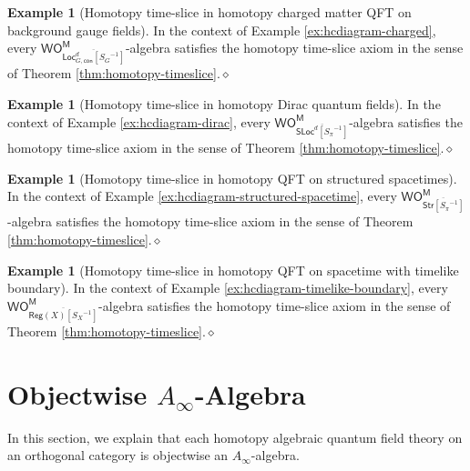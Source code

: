 \documentclass{amsbook}
\numberwithin{section}{chapter}
\numberwithin{subsection}{section}
\numberwithin{equation}{section}
\theoremstyle{plain}
\theoremstyle{definition}
\newtheorem{example}[equation]{Example}
\newcommand{\M}{\mathsf{M}}
\renewcommand{\O}{\mathsf{O}}
\newcommand{\Otom}{\O^{\M}}
\newcommand{\W}{\mathsf{W}}
\newcommand{\dqed}{\hfill$\diamond$}
\newcommand{\inv}[1]{{#1}^{-1}}
\newcommand{\Bgconloc}{\Locd_{G,\mathsf{con}}}
\newcommand{\Bgconlocsginv}{\Bgconloc[\inv{S_G}]}
\newcommand{\Bgconlocsginvbar}{\overline{\Bgconlocsginv}}
\newcommand{\Loc}{\mathsf{Loc}}
\newcommand{\Locd}{\Loc^d}
\newcommand{\Reg}{\mathsf{Reg}}
\newcommand{\Regx}{\Reg(X)}
\newcommand{\Regxsinv}{\Regx[\inv{S_X}]}
\newcommand{\Regxsinvbar}{\overline{\Regxsinv}}
\newcommand{\Sloc}{\mathsf{SLoc}}
\newcommand{\Slocd}{\Sloc^d}
\newcommand{\Slocdsinv}{\Slocd[\inv{S_{\pi}}]}
\newcommand{\Slocdsinvbar}{\overline{\Slocdsinv}}
\newcommand{\Str}{\mathsf{Str}}
\newcommand{\Strsinv}{\Str[\inv{S_{\pi}}]}
\newcommand{\Strsinvbar}{\overline{\Strsinv}}
\newcommand{\wom}{\W\Otom}
\begin{document}
\begin{example}[Homotopy time-slice in homotopy charged matter QFT on background gauge fields]\label{ex:hts-charged}
In the context of Example \ref{ex:hcdiagram-charged}, every  $\wom_{\Bgconlocsginvbar}$-algebra satisfies the homotopy time-slice axiom in the sense of Theorem \ref{thm:homotopy-timeslice}.\dqed
\end{example}

\begin{example}[Homotopy time-slice in homotopy Dirac quantum fields]\label{ex:hts-dirac}
In the context of Example \ref{ex:hcdiagram-dirac}, every  $\wom_{\Slocdsinvbar}$-algebra satisfies the homotopy time-slice axiom in the sense of Theorem \ref{thm:homotopy-timeslice}.\dqed
\end{example}

\begin{example}[Homotopy time-slice in homotopy QFT on structured spacetimes]\label{ex:hts-structured-spacetime}
In the context of Example \ref{ex:hcdiagram-structured-spacetime}, every  $\wom_{\Strsinvbar}$-algebra satisfies the homotopy time-slice axiom in the sense of Theorem \ref{thm:homotopy-timeslice}.\dqed
\end{example}

\begin{example}[Homotopy time-slice in homotopy QFT on spacetime with timelike boundary]\label{ex:hts-boundary}
In the context of Example \ref{ex:hcdiagram-timelike-boundary}, every  $\wom_{\Regxsinvbar}$-algebra satisfies the homotopy time-slice axiom in the sense of Theorem \ref{thm:homotopy-timeslice}.\dqed
\end{example}


\section{Objectwise $A_\infty$-Algebra}\label{sec:objective-ainfinity}

In this section, we explain that each homotopy algebraic quantum field theory on an orthogonal category is objectwise an $A_\infty$-algebra.
\end{document}

